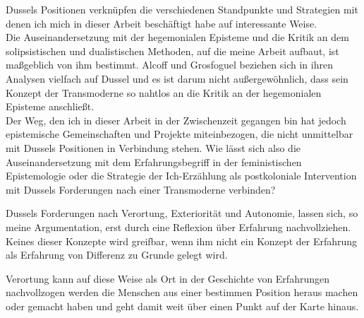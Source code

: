 Dussels Positionen verknüpfen die verschiedenen Standpunkte und Strategien mit
denen ich mich in dieser Arbeit beschäftigt habe auf interessante Weise. \\
Die
Auseinandersetzung mit der hegemonialen Episteme und die Kritik an dem
solipsistischen und dualistischen Methoden, auf die meine Arbeit aufbaut, ist
maßgeblich von ihm bestimmt. Alcoff und Grosfoguel beziehen sich in ihren
Analysen vielfach auf Dussel und es ist darum nicht außergewöhnlich, dass sein
Konzept der Transmoderne so nahtlos an die Kritik an der hegemonialen Episteme
anschließt.\\
 Der Weg, den ich in dieser Arbeit in der Zwischenzeit gegangen bin
hat jedoch epistemische Gemeinschaften und Projekte miteinbezogen, die nicht
unmittelbar mit Dussels Positionen in Verbindung stehen. Wie lässt sich also die
Auseinandersetzung mit dem Erfahrungsbegriff in der feministischen Epistemologie
oder die Strategie der Ich-Erzählung als postkoloniale Intervention mit Dussels
Forderungen nach einer Transmoderne verbinden?

Dussels Forderungen nach Verortung, Exteriorität und Autonomie, lassen sich, so
meine Argumentation, erst durch eine Reflexion über Erfahrung nachvollziehen.
Keines dieser Konzepte wird greifbar, wenn ihm nicht ein Konzept der Erfahrung
als Erfahrung von Differenz zu Grunde gelegt wird.

Verortung kann auf diese Weise als Ort in der Geschichte von Erfahrungen
nachvollzogen werden die Menschen aus einer bestimmen Position heraus machen
oder gemacht haben und geht damit weit über einen Punkt auf der Karte hinaus.\\

